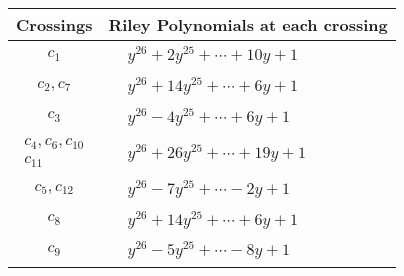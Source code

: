 \documentclass[1p]{elsarticle_modified}
\theoremstyle{definition}
\begin{document}
\begin{tabular}{m{50pt}|m{274pt}}
Crossings & \hspace{64pt}Riley Polynomials at each crossing \\
\hline $$\begin{aligned}c_{1}\end{aligned}$$&$\begin{aligned}
&y^{26}+2 y^{25}+\cdots+10 y+1
\end{aligned}$\\
\hline $$\begin{aligned}c_{2},c_{7}\end{aligned}$$&$\begin{aligned}
&y^{26}+14 y^{25}+\cdots+6 y+1
\end{aligned}$\\
\hline $$\begin{aligned}c_{3}\end{aligned}$$&$\begin{aligned}
&y^{26}-4 y^{25}+\cdots+6 y+1
\end{aligned}$\\
\hline $$\begin{aligned}c_{4},c_{6},c_{10}\\c_{11}\end{aligned}$$&$\begin{aligned}
&y^{26}+26 y^{25}+\cdots+19 y+1
\end{aligned}$\\
\hline $$\begin{aligned}c_{5},c_{12}\end{aligned}$$&$\begin{aligned}
&y^{26}-7 y^{25}+\cdots-2 y+1
\end{aligned}$\\
\hline $$\begin{aligned}c_{8}\end{aligned}$$&$\begin{aligned}
&y^{26}+14 y^{25}+\cdots+6 y+1
\end{aligned}$\\
\hline $$\begin{aligned}c_{9}\end{aligned}$$&$\begin{aligned}
&y^{26}-5 y^{25}+\cdots-8 y+1
\end{aligned}$\\
\hline
\end{tabular}\\~\\
\end{document}
